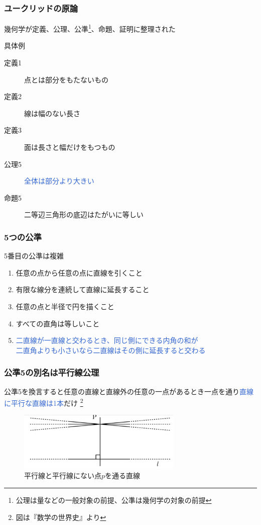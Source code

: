 \documentclass[unicode, 14pt, aspectratio=169]{beamer}
\newcommand\blfootnote[1]{%
  \begingroup
  \renewcommand\thefootnote{}\footnote{#1}%
  \addtocounter{footnote}{-1}%
  \endgroup
}
\begin{document}
\begin{frame}
  \frametitle{ユークリッドの原論}
  {\large 幾何学が定義、公理、公準\footnote{公理は量などの一般対象の前提、公準は幾何学の対象の前提}、命題、証明に整理された}
  \par
  \vspace{16pt}
  具体例
  \begin{description}
  \item[定義1] 点とは部分をもたないもの
  \item[定義2] 線は幅のない長さ
  \item[定義3] 面は長さと幅だけをもつもの
  \item[公理5] \textcolor{highlight}{全体は部分より大きい}
  \item[命題5] 二等辺三角形の底辺はたがいに等しい
  \end{description}
\end{frame}
\begin{frame}
  \frametitle{5つの公準}
  {\large 5番目の公準は複雑}
  \par
  \vspace{16pt}  
  \begin{enumerate}
  \item 任意の点から任意の点に直線を引くこと
  \item 有限な線分を連続して直線に延長すること
  \item 任意の点と半径で円を描くこと
  \item すべての直角は等しいこと
  \item \textcolor{highlight}{二直線が一直線と交わるとき、同じ側にできる内角の和が\\二直角よりも小さいなら二直線はその側に延長すると交わる}
  \end{enumerate}
\end{frame}
\begin{frame}[t]
  \frametitle{公準5の別名は平行線公理}
  {\large 公準5を換言すると任意の直線と直線外の任意の一点があるとき一点を通り\textcolor{highlight}{直線に平行な直線は1本}だけ}
  \blfootnote{図は『数学の世界史』\supercite{suugaku-no-sekaishi}より}
  \begin{figure}
    \includegraphics[width=0.7\textwidth]{images/axiom5.png}
    \caption{平行線と平行線にない点$p$を通る直線}
  \end{figure}
\end{frame}
\end{document}
